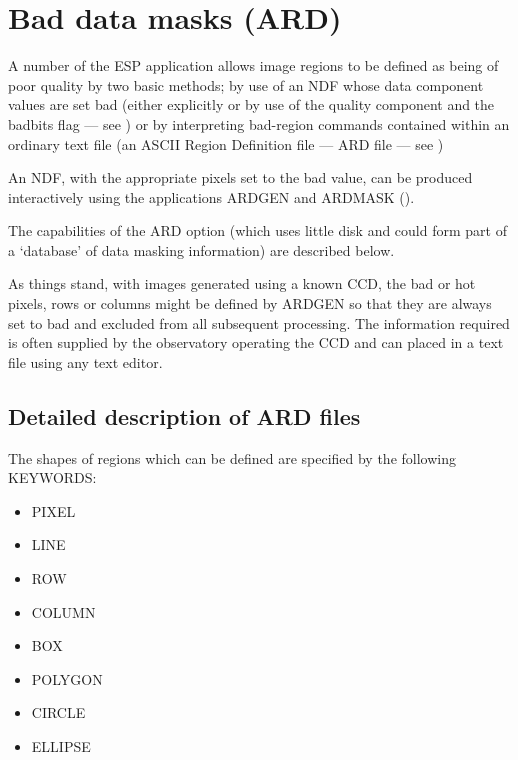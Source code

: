 \documentclass[twoside,11pt]{starlink}
\begin{document}
\newpage

\section{Bad data masks (ARD)}
\label{app:bad}

A number of the ESP application allows image regions to be defined as being of
poor quality by two basic methods; by use of an NDF whose data component
values are set bad (either explicitly or by use of the quality component
and the badbits flag --- see ) or by interpreting bad-region
commands contained within an ordinary text file (an ASCII Region Definition file
--- ARD file --- see )

An NDF, with the appropriate pixels set to the bad value, can be produced
interactively using the  applications ARDGEN and ARDMASK
().

The capabilities of the ARD option (which uses little disk
and could form part of a `database' of data masking information)
are described below.

As things stand, with images generated using a known CCD, the bad or hot
pixels, rows or columns might be
defined by ARDGEN so that they are always set to bad and excluded from all
subsequent processing. The information required is often supplied by the
observatory operating the CCD and can placed in a text file using
any text editor.

\subsection{Detailed description of ARD files}

The shapes of regions which can be defined are specified by the
following KEYWORDS:
\begin{itemize}
\item PIXEL
\item LINE
\item ROW
\item COLUMN
\item BOX
\item POLYGON
\item CIRCLE
\item ELLIPSE
\end{itemize}
\end{document}
